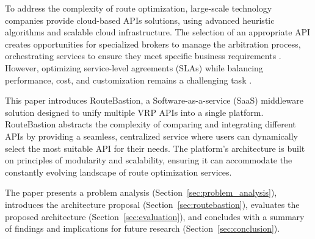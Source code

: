 To address the complexity of route optimization, large-scale technology companies provide cloud-based APIs solutions, using advanced heuristic algorithms and scalable cloud infrastructure. The selection of an appropriate API creates opportunities for specialized brokers to manage the arbitration process, orchestrating services to ensure they meet specific business requirements \cite{Brokering2019JPDC,cloudbrokersms2024ieeetransactions}. However, optimizing service-level agreements (SLAs) while balancing performance, cost, and customization remains a challenging task \cite{MCDM2022ieeeaccess}.

This paper introduces RouteBastion, a Software-as-a-service (SaaS) middleware solution designed to unify multiple VRP APIs into a single platform. RouteBastion abstracts the complexity of comparing and integrating different APIs by providing a seamless, centralized service where users can dynamically select the most suitable API for their needs. The platform's architecture is built on principles of modularity and scalability, ensuring it can accommodate the constantly evolving landscape of route optimization services.

The paper presents a problem analysis (Section~\ref{sec:problem_analysis}), introduces the architecture proposal (Section~\ref{sec:routebastion}), evaluates the proposed architecture (Section~\ref{sec:evaluation}), and concludes with a summary of findings and implications for future research (Section~\ref{sec:conclusion}).
